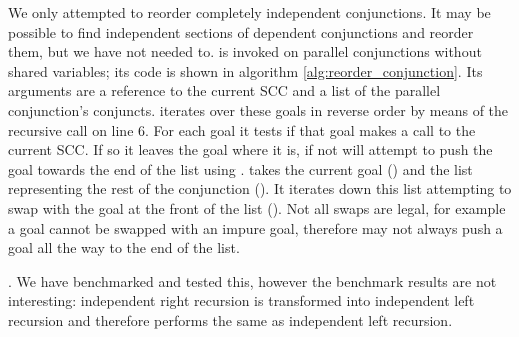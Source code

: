 We only attempted to reorder completely independent conjunctions.
It may be possible to find independent sections of dependent conjunctions
and reorder them,
but we have not needed to.
\reorder is invoked on parallel conjunctions without shared variables;
its code is shown in algorithm \ref{alg:reorder_conjunction}.
Its arguments are a reference to the current SCC and a list of the parallel
conjunction's conjuncts.
\reorder iterates over these goals in reverse order by means of the
recursive call on line 6.
For each goal it tests if that goal makes a call to the current SCC.
If so it leaves the goal where it is,
if not \reorder will attempt to push the goal towards the end of the
list using \trypushconjlater.
\trypushconjlater takes the current goal () and the list
representing the rest of the conjunction ().
It iterates down this list attempting to swap  with the goal at
the front of the list ().
Not all swaps are legal,
for example a goal cannot be swapped with an impure goal,
therefore \trypushconjlater may not always push a goal all the way to the
end of the list.

.
We have benchmarked and tested this,
however the benchmark results are not interesting:
independent right recursion is transformed into independent left
recursion and therefore performs the same as independent left recursion.

